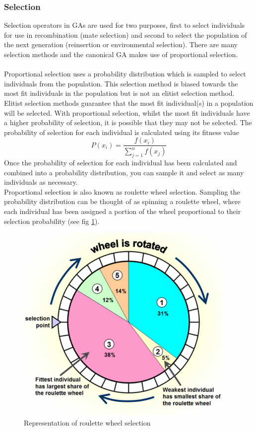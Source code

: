 \subsubsection{Selection}
\label{sec:gaselec}
Selection operators in GAs are used for two purposes, first to select individuals for use in recombination (mate selection) and second to select the population of the next generation (reinsertion or environmental selection). There are many selection methods and the canonical GA makes use of proportional selection.
\\\\Proportional selection uses a probability distribution which is sampled to select individuals from the population. This selection method is biased towards the most fit individuals in the population but is not an elitist selection method. Elitist selection methods guarantee that the most fit individual(s) in a population will be selected. With proportional selection, whilst the most fit individuals have a higher probability of selection, it is possible that they may not be selected. The probability of selection for each individual is calculated using its fitness value\cite{4-se, eoselect, gaselect, gatsp}
\begin{equation}
  P(x_{i}) = \frac{f(x_{i})}{\sum_{j=1}^{n}{f(x_{j})}}
\end{equation}
Once the probability of selection for each individual has been calculated and combined into a probability distribution, you can sample it and select as many individuals as necessary.
\\Proportional selection is also known as roulette wheel selection. Sampling the probability distribution can be thought of as spinning a roulette wheel, where each individual has been assigned a portion of the wheel proportional to their selection probability (see fig \ref{fig:roulette}\cite{rw}).
\begin{figure}[tp]
   \begin{center}
     \includegraphics{Figures/roulette_wheel}
   \end{center}
   \caption{Representation of roulette wheel selection}
   \label{fig:roulette}
\end{figure} 
